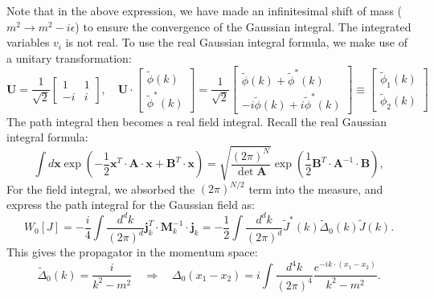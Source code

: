 Note that in the above expression, we have made an infinitesimal shift of mass ($m^2 \rightarrow m^2 - i\epsilon$) to ensure the convergence of the Gaussian integral.
The integrated variables $v_i$ is not real.
To use the real Gaussian integral formula, we make use of a unitary transformation: 
\begin{equation*}
	\mathbf U = \frac{1}{\sqrt 2} \left[\begin{array}{cc}
		1 & 1 \\
		-i & i
	\end{array}\right], \quad
	\mathbf U \cdot \left[
	\begin{array}{c}
		\tilde{\phi}(k) \\ 
		\tilde{\phi}^*(k) 
	\end{array}\right] 
	= \frac{1}{\sqrt 2}\left[
	\begin{array}{c}
		\tilde\phi(k)+\tilde\phi^*(k) \\ 
		-i\tilde\phi(k)+i\tilde\phi^*(k)
	\end{array}\right]
	\equiv \left[
	\begin{array}{c}
		\tilde\phi_1(k) \\ 
		\tilde\phi_2(k) 
	\end{array}\right]
\end{equation*}
The path integral then becomes a real field integral.
Recall the real Gaussian integral formula:
\begin{equation}
	\int d\mathbf x \exp\left(-\frac{1}{2}\mathbf{x}^T \cdot \mathbf A \cdot \mathbf{x} + \mathbf{B}^T \cdot \mathbf{x}\right) 
	= \sqrt{\frac{(2\pi)^N}{\det{\mathbf A}}}\exp\left(\frac{1}{2}\mathbf{B}^T \cdot \mathbf{A}^{-1} \cdot \mathbf{B}\right),
	\label{eq:real-gaussian-integral}
\end{equation}
For the field integral, we absorbed the $(2\pi)^{N/2}$ term into the measure, and express the path integral for the Gaussian field as:
\begin{equation}
	W_0[J] 
	= -\frac{i}{4}\int \frac{d^d k}{(2\pi)^d} \mathbf j^T_k \cdot \mathbf M^{-1}_k \cdot \mathbf j_k
	= -\frac{1}{2} \int \frac{d^d k}{(2\pi)^d}  \tilde{J}^*(k) \tilde{\Delta}_0(k) \tilde{J}(k).
\end{equation}
This gives the propagator in the momentum space:
\begin{equation}
	\tilde{\Delta}_0(k) = \frac{i}{k^2-m^2}
	\quad \Longrightarrow \quad 
	\Delta_0(x_1-x_2) = i\int\frac{d^{4} k}{(2\pi)^{4}} \frac{e^{-i k\cdot (x_1-x_2)}}{k^2-m^2}.
\end{equation}


